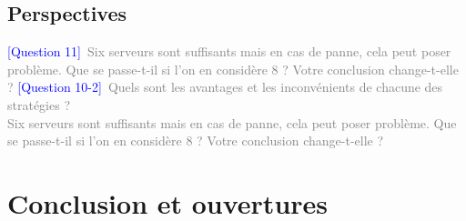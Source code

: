 \documentclass[12pt,a4paper]{paper}
\begin{document}
\subsection{Perspectives}
\textcolor{blue}{[Question 11]}~\textcolor{gray}{Six serveurs sont suffisants mais en cas de panne, cela peut poser problème. Que se passe-t-il si l’on en considère 8 ? Votre conclusion change-t-elle ?}
\textcolor{blue}{[Question 10-2]}~\textcolor{gray}{Quels sont les avantages et les inconvénients de chacune des stratégies ? \\ Six serveurs sont suffisants mais en cas de panne, cela peut poser problème. Que se passe-t-il si l’on en considère 8 ? Votre conclusion change-t-elle ?}

\section{Conclusion et ouvertures}
\textcolor{gray}{\lipsum[1-2] }
% 

\printbibliography
{}
% 

\appendix
\end{document}
